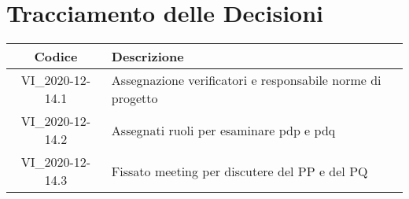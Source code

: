 \section*{Tracciamento delle Decisioni}

\begin{center}
	\begin{longtable}{|c|p{14.5cm}|}
	\hline
	\rowcolor{lighter-grayer}
	\textbf{Codice} & \textbf{Descrizione} \\
	\hline
	\endfirsthead

	\hline
	VI\_2020-12-14.1 & Assegnazione verificatori e responsabile norme di progetto\\
	VI\_2020-12-14.2 & Assegnati ruoli per esaminare pdp e pdq\\
	VI\_2020-12-14.3 & Fissato meeting per discutere del PP e del PQ \\
	\hline

	\end{longtable}
\end{center}
